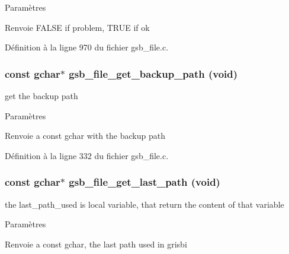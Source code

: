 \begin{DoxyParams}{Paramètres}
\item[{\em }]\end{DoxyParams}
\begin{DoxyReturn}{Renvoie}
FALSE if problem, TRUE if ok 
\end{DoxyReturn}


Définition à la ligne 970 du fichier gsb\_\-file.c.

\subsubsection[{gsb\_\-file\_\-get\_\-backup\_\-path}]{\setlength{\rightskip}{0pt plus 5cm}const gchar$\ast$ gsb\_\-file\_\-get\_\-backup\_\-path (void)}\label{gsb__file_8h_ae0e03d0f99a78e13e6907c6afe498293}
get the backup path


\begin{DoxyParams}{Paramètres}
\item[{\em }]\end{DoxyParams}
\begin{DoxyReturn}{Renvoie}
a const gchar with the backup path 
\end{DoxyReturn}


Définition à la ligne 332 du fichier gsb\_\-file.c.

\subsubsection[{gsb\_\-file\_\-get\_\-last\_\-path}]{\setlength{\rightskip}{0pt plus 5cm}const gchar$\ast$ gsb\_\-file\_\-get\_\-last\_\-path (void)}\label{gsb__file_8h_a05b2359af2cda48c801099a2d222aa55}
the last\_\-path\_\-used is local variable, that return the content of that variable


\begin{DoxyParams}{Paramètres}
\item[{\em }]\end{DoxyParams}
\begin{DoxyReturn}{Renvoie}
a const gchar, the last path used in grisbi 
\end{DoxyReturn}


